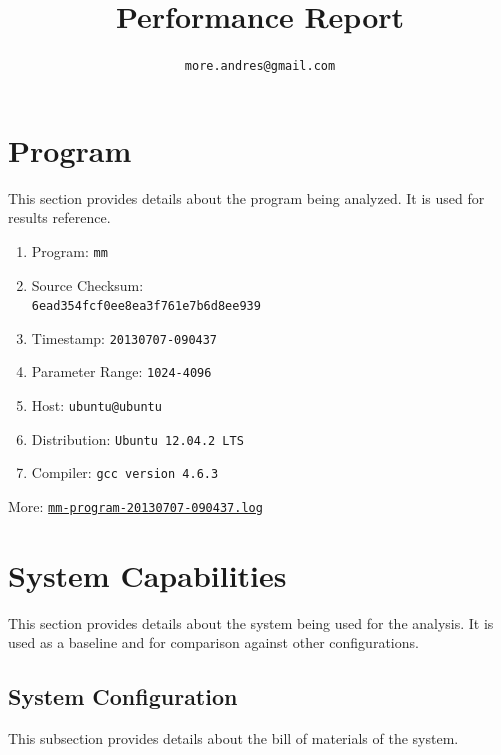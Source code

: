 \documentclass[a4paper]{article}
\begin{document}
\title{Performance Report}

\author{\tt more.andres@gmail.com}

\maketitle


\tableofcontents

\section{Program}

This section provides details about the program being analyzed.
It is used for results reference.

\begin{enumerate}
\item Program: {\tt mm}
\item Source Checksum:\\ {\tt 6ead354fcf0ee8ea3f761e7b6d8ee939}
\item Timestamp: {\tt 20130707-090437}
\item Parameter Range: {\tt 1024-4096}
\item Host: {\tt ubuntu@ubuntu}
\item Distribution: {\tt Ubuntu 12.04.2 LTS}
\item Compiler: {\tt gcc version 4.6.3}
\end{enumerate}

More: \href{TBD}{\tt mm-program-20130707-090437.log}

\section{System Capabilities}

This section provides details about the system being used for the analysis.
It is used as a baseline and for comparison against other configurations.

\subsection{System Configuration}

This  subsection provides details about the bill of materials of the system.
\end{document}
